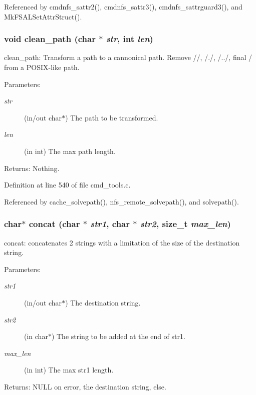 Referenced by cmdnfs\_\-sattr2(), cmdnfs\_\-sattr3(), cmdnfs\_\-sattrguard3(), and Mk\-FSALSet\-Attr\-Struct().
\subsubsection{\setlength{\rightskip}{0pt plus 5cm}void clean\_\-path (char $\ast$ {\em str}, int {\em len})}\label{cmd__tools_8h_a16}


clean\_\-path: Transform a path to a cannonical path. Remove //, /./, /../, final / from a POSIX-like path.

\begin{Desc}
\item[Parameters:]
\begin{description}
\item[{\em str}](in/out char$\ast$) The path to be transformed. \item[{\em len}](in int) The max path length. \end{description}
\end{Desc}
\begin{Desc}
\item[Returns:]Nothing. \end{Desc}


Definition at line 540 of file cmd\_\-tools.c.

Referenced by cache\_\-solvepath(), nfs\_\-remote\_\-solvepath(), and solvepath().
\subsubsection{\setlength{\rightskip}{0pt plus 5cm}char$\ast$ concat (char $\ast$ {\em str1}, char $\ast$ {\em str2}, size\_\-t {\em max\_\-len})}\label{cmd__tools_8h_a17}


concat: concatenates 2 strings with a limitation of the size of the destination string.

\begin{Desc}
\item[Parameters:]
\begin{description}
\item[{\em str1}](in/out char$\ast$) The destination string. \item[{\em str2}](in char$\ast$) The string to be added at the end of str1. \item[{\em max\_\-len}](in int) The max str1 length. \end{description}
\end{Desc}
\begin{Desc}
\item[Returns:]NULL on error, the destination string, else. \end{Desc}


